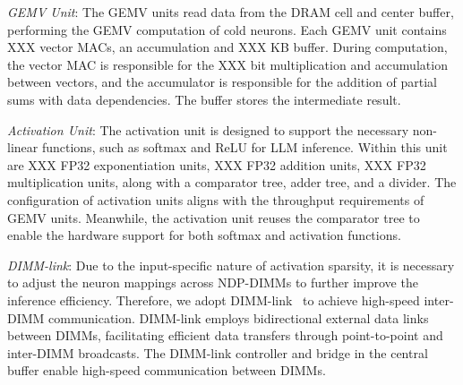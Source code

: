 \textit{GEMV Unit}: 
The GEMV units read data from the DRAM cell and center buffer, performing the GEMV computation of cold neurons.
Each GEMV unit contains XXX vector MACs, an accumulation and XXX KB buffer. 
During computation, the vector MAC is responsible for the XXX bit multiplication and accumulation between vectors, and the accumulator is responsible for the addition of partial sums with data dependencies. The buffer stores the intermediate result.

\textit{Activation Unit}: The activation unit is designed to support the necessary non-linear functions, such as softmax and ReLU for LLM inference. 
Within this unit are XXX FP32 exponentiation units, XXX FP32 addition units, XXX FP32 multiplication units, along with a comparator tree, adder tree, and a divider. The configuration of activation units aligns with the throughput requirements of GEMV units. 
Meanwhile, the activation unit reuses the comparator tree to enable the hardware support for both softmax and activation functions.

\textit{DIMM-link}: 
Due to the input-specific nature of activation sparsity, it is necessary to adjust the neuron mappings across NDP-DIMMs to further improve the inference efficiency. Therefore, we adopt DIMM-link~\cite{zhou2023dimm} to achieve high-speed inter-DIMM communication. DIMM-link employs bidirectional external data links between DIMMs, facilitating efficient data transfers through point-to-point and inter-DIMM broadcasts. The DIMM-link controller and bridge in the central buffer enable high-speed communication between DIMMs.

